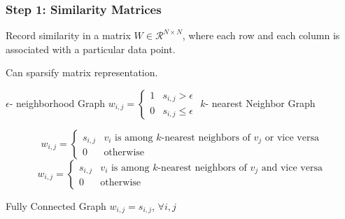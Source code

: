 \documentclass{beamer}
\begin{document}
\begin{frame}
    \frametitle{Step 1: Similarity Matrices}
    Record similarity in a matrix $W \in \mathcal{R}^{N \times N}$, where each row and each column is associated with a particular data point. 
    
    \vspace{0.25cm } Can sparsify matrix representation.


        
    \begin{outline}
        \1 $\epsilon$- neighborhood Graph
            $
            w_{i,j} = \begin{cases}
                1 & s_{i, j} > \epsilon \\
                0 & s_{i, j} \leq \epsilon
            \end{cases}
            $
        \1 $k$- nearest Neighbor Graph \vspace{-0.5 cm}
            
                $$ w_{i,j} = \begin{cases}
                s_{i,j} & v_i \textrm{ is among }k\textrm{-nearest neighbors of } v_j \textrm{ or vice versa} \\
                0 & \textrm{otherwise}
                        \end{cases}$$
                  \vspace{-0.25cm}
            $$w_{i,j} = \begin{cases}
                s_{i,j} & v_i \textrm{ is among }k\textrm{-nearest neighbors of } v_j \textrm{ and vice versa} \\
                0 & \textrm{otherwise}
            \end{cases}$$
            
        \1 Fully Connected Graph \qquad $w_{i,j} = s_{i, j}$, $\forall i,j$
    \end{outline}
\end{frame}
\end{document}
